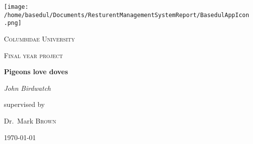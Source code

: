 \begin{titlepage}
\begin{center}
	\centering
	\texttt{[image: /home/basedul/Documents/ResturentManagementSystemReport/BasedulAppIcon.png]}\par\vspace{1cm}
	{\scshape\LARGE Columbidae University \par}
	\vspace{1cm}
	{\scshape\Large Final year project\par}
	\vspace{1.5cm}
	{\huge\bfseries Pigeons love doves\par}
	\vspace{2cm}
	{\Large\itshape John Birdwatch\par}
	\vfill
	supervised by\par
	Dr.~Mark \textsc{Brown}

	\vfill

	{\large \today\par}
\end{center}
\end{titlepage}
